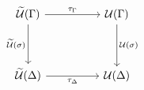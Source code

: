 \[\begin{tikzcd}
	{\Tm(\Gamma)} && {\Ty(\Gamma)} \\
	\\
	{\Tm(\Delta)} && {\Ty(\Delta)}
	\arrow["{\tau_{\Gamma}}", from=1-1, to=1-3]
	\arrow["{\tau_{\Delta}}"', from=3-1, to=3-3]
	\arrow["{\Tm(\sigma)}"', from=1-1, to=3-1]
	\arrow["{\Ty(\sigma)}", from=1-3, to=3-3]
\end{tikzcd}\]